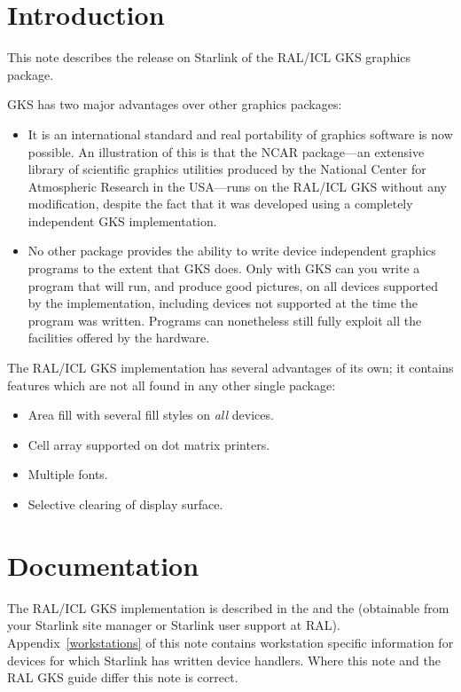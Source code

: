 \documentclass[11pt,nolof]{starlink}
\begin{document}
\scfrontmatter


\section{Introduction}
This note describes the release on Starlink of the RAL/ICL GKS graphics
package.

GKS has two major advantages over other graphics packages:
\begin{itemize}

\item It is an international standard and real portability of graphics software
is now possible. An illustration of this is that the NCAR
package---an extensive library of scientific graphics utilities produced by the
National Center for Atmospheric Research in the USA---runs on the RAL/ICL GKS
without any modification, despite the fact that it was developed using a
completely independent GKS implementation.

\item No other package provides the ability to write device independent graphics
programs to the extent that GKS does.
Only with GKS can you write a program that will run, and produce good pictures,
on all devices supported by the implementation, including devices not supported
at the time the program was written.
Programs can nonetheless still fully exploit all the facilities offered by the
hardware.
\end{itemize}
The RAL/ICL GKS implementation has several advantages of its own;
it contains features which are not all found in any other single package:
\begin{itemize}
\item Area fill with several fill styles on \emph{all\/} devices.
\item Cell array supported on dot matrix printers.
\item Multiple fonts.
\item Selective clearing of display surface.
\end{itemize}
\section{Documentation}
The RAL/ICL GKS implementation is described in the
and the
(obtainable
from your Starlink site manager or Starlink user support at RAL).
Appendix~\ref{workstations} of this note contains workstation specific
information for devices
for which Starlink has written device handlers.
Where this note and the RAL GKS guide differ this note is correct.
\end{document}
